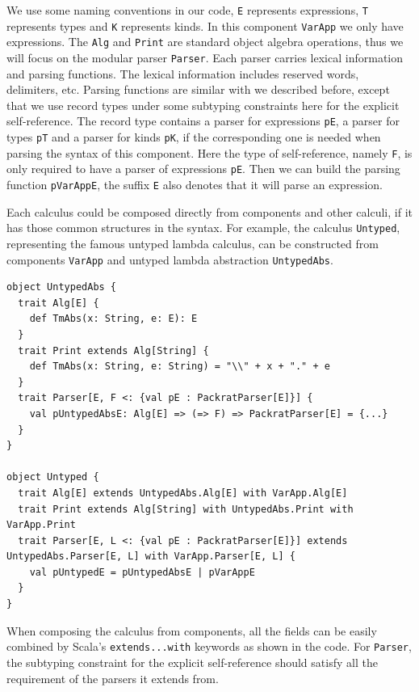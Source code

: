 We use some naming conventions in our code, \lstinline{E} represents expressions, \lstinline{T} represents types and \lstinline{K} represents kinds. In this component \lstinline{VarApp} we only have expressions. The \lstinline{Alg} and \lstinline{Print} are standard object algebra operations, thus we will focus on the modular parser \lstinline{Parser}. Each parser carries lexical information and parsing functions. The lexical information includes reserved words, delimiters, etc. Parsing functions are similar with we described before, except that we use record types under some subtyping constraints here for the explicit self-reference. The record type contains a parser for expressions \lstinline{pE}, a parser for types \lstinline{pT} and a parser for kinds \lstinline{pK}, if the corresponding one is needed when parsing the syntax of this component. Here the type of self-reference, namely \lstinline{F}, is only required to have a parser of expressions \lstinline{pE}. Then we can build the parsing function \lstinline{pVarAppE}, the suffix \lstinline{E} also denotes that it will parse an expression.

Each calculus could be composed directly from components and other calculi, if it has those common structures in the syntax. For example, the calculus \lstinline{Untyped}, representing the famous untyped lambda calculus, can be constructed from components \lstinline{VarApp} and untyped lambda abstraction \lstinline{UntypedAbs}.

\begin{lstlisting}
object UntypedAbs {
  trait Alg[E] {
    def TmAbs(x: String, e: E): E
  }
  trait Print extends Alg[String] {
    def TmAbs(x: String, e: String) = "\\" + x + "." + e
  }
  trait Parser[E, F <: {val pE : PackratParser[E]}] {
    val pUntypedAbsE: Alg[E] => (=> F) => PackratParser[E] = {...}
  }
}

object Untyped {
  trait Alg[E] extends UntypedAbs.Alg[E] with VarApp.Alg[E]
  trait Print extends Alg[String] with UntypedAbs.Print with VarApp.Print
  trait Parser[E, L <: {val pE : PackratParser[E]}] extends UntypedAbs.Parser[E, L] with VarApp.Parser[E, L] {
    val pUntypedE = pUntypedAbsE | pVarAppE
  }
}
\end{lstlisting}

When composing the calculus from components, all the fields can be easily combined by Scala’s \lstinline{extends...with} keywords as shown in the code. For \lstinline{Parser}, the subtyping constraint for the explicit self-reference should satisfy all the requirement of the parsers it extends from. 

